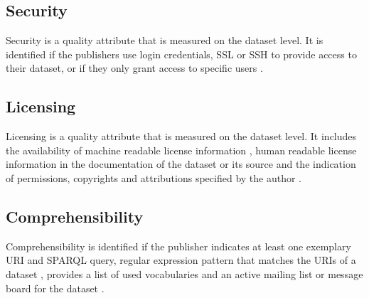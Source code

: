 \documentclass[onecolumn, crcready]{iosart2c}
\begin{document}
\subsection{Security}

Security is a quality attribute that is measured on the dataset level. It is identified if the publishers use login credentials, SSL or SSH to provide access to their dataset, or if they only grant access to specific users \cite{Framework2012}.

\subsection{Licensing}

Licensing is a quality attribute that is measured on the dataset level. It includes the availability of machine readable license information \cite{Hogan:2012:ESL:2263498.2264570}, human readable license information in the documentation of the dataset or its source \cite{Hogan:2012:ESL:2263498.2264570} and the indication of permissions, copyrights and attributions specified by the author \cite{Framework2012}.

\subsection{Comprehensibility}

Comprehensibility is identified if the publisher indicates at least one exemplary URI and SPARQL query, regular expression pattern that matches the URIs of a dataset \cite{Framework2012}, provides a list of used vocabularies and an active mailing list or message board for the dataset \cite{flemming2010}. 
\end{document}

